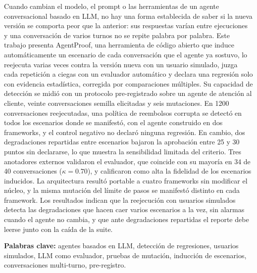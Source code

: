 \clearpage
\blank
{}
\begingroup\dobleesp
\vspace{6pt}
Cuando cambian el modelo, el prompt o las herramientas de un agente conversacional basado en LLM, no hay una forma establecida de saber si la nueva versión se comporta peor que la anterior: sus respuestas varían entre ejecuciones y una conversación de varios turnos no se repite palabra por palabra. Este trabajo presenta AgentProof, una herramienta de código abierto que induce automáticamente un escenario de cada conversación que el agente ya sostuvo, lo reejecuta varias veces contra la versión nueva con un usuario simulado, juzga cada repetición a ciegas con un evaluador automático y declara una regresión solo con evidencia estadística, corregida por comparaciones múltiples. Su capacidad de detección se midió con un protocolo pre-registrado sobre un agente de atención al cliente, veinte conversaciones semilla elicitadas y seis mutaciones. En 1200 conversaciones reejecutadas, una política de reembolsos corrupta se detectó en todos los escenarios donde se manifestó, con el agente construido en dos frameworks, y el control negativo no declaró ninguna regresión. En cambio, dos degradaciones repartidas entre escenarios bajaron la aprobación entre 25 y 30 puntos sin declararse, lo que muestra la sensibilidad limitada del criterio. Tres anotadores externos validaron el evaluador, que coincide con su mayoría en 34 de 40 conversaciones ($\kappa = 0.70$), y calificaron como alta la fidelidad de los escenarios inducidos. La arquitectura resultó portable a cuatro frameworks sin modificar el núcleo, y la misma mutación del límite de pasos se manifestó distinto en cada framework. Los resultados indican que la reejecución con usuarios simulados detecta las degradaciones que hacen caer varios escenarios a la vez, sin alarmas cuando el agente no cambia, y que ante degradaciones repartidas el reporte debe leerse junto con la caída de la suite.
\par\vspace{6pt}
\textbf{Palabras clave:} agentes basados en LLM, detección de regresiones, usuarios simulados, LLM como evaluador, pruebas de mutación, inducción de escenarios, conversaciones multi-turno, pre-registro.
\par
\endgroup
